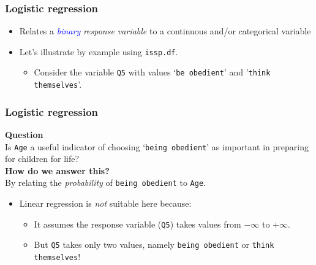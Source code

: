 \documentclass{beamer}\usepackage[]{graphicx}\usepackage[]{color}
\begin{document}
\begin{frame}[fragile]
\frametitle{Logistic regression}
\begin{itemize}
\item Relates a \textcolor{blue}{\emph{binary}} \emph{response variable}
to a continuous and/or categorical variable
\item Let's illustrate by example using \texttt{issp.df}.
\begin{itemize}
\item Consider the variable \texttt{Q5} with values `\texttt{be obedient}' and '\texttt{think themselves}'.
\end{itemize}
\end{itemize}
\end{frame}

\begin{frame}[fragile]
\frametitle{Logistic regression}
\begin{center}
\textbf{Question} \\
Is \texttt{Age} a useful indicator of choosing `\texttt{being obedient}' as important in preparing for children for life? \\[0.2cm]
\textbf{How do we answer this?} \\
By relating the \emph{probability} of \texttt{being obedient} 
to \texttt{Age}.
\end{center}  
\begin{itemize}
\item Linear regression is \emph{not} suitable here because:
\begin{itemize}
\item It assumes the response variable (\texttt{Q5}) takes values from $-\infty$ to $+\infty$.\\
\item But \texttt{Q5} takes only two values, namely \texttt{being obedient} or \texttt{think themselves}!
\end{itemize}
\end{itemize}
\end{frame}
\end{document}
